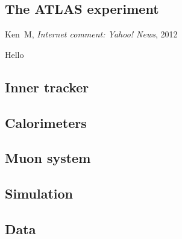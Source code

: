 \begin{singlespacing}
\chapter{The ATLAS experiment}
\label{chapter:experiment}
%
\begin{epigraphs}
%
{Ken~M,
\textit{Internet comment: Yahoo! News},
2012~\cite{kenm2012inner}}
\end{epigraphs}
\end{singlespacing}

Hello


\section{Inner tracker}

\section{Calorimeters}

\section{Muon system}

\section{Simulation}

\section{Data}
